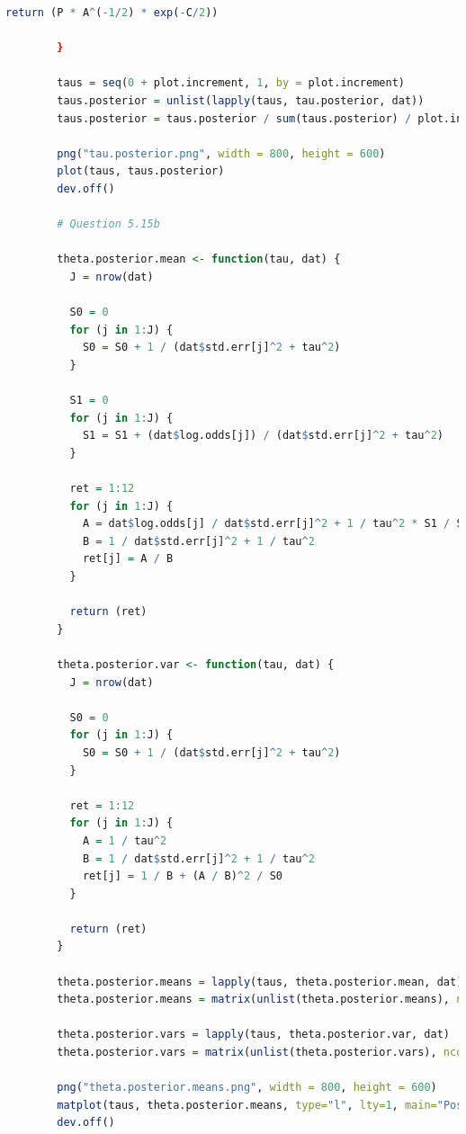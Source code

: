 \documentclass{article}
\begin{document}
{\begin{lstlisting}[language=R]
          return (P * A^(-1/2) * exp(-C/2))
          
        }
        
        taus = seq(0 + plot.increment, 1, by = plot.increment)
        taus.posterior = unlist(lapply(taus, tau.posterior, dat))
        taus.posterior = taus.posterior / sum(taus.posterior) / plot.increment # rescale to 1
        
        png("tau.posterior.png", width = 800, height = 600)
        plot(taus, taus.posterior)
        dev.off()
        
        # Question 5.15b
        
        theta.posterior.mean <- function(tau, dat) {
          J = nrow(dat)
          
          S0 = 0
          for (j in 1:J) {
            S0 = S0 + 1 / (dat$std.err[j]^2 + tau^2)
          }
          
          S1 = 0
          for (j in 1:J) {
            S1 = S1 + (dat$log.odds[j]) / (dat$std.err[j]^2 + tau^2)
          }
          
          ret = 1:12
          for (j in 1:J) {
            A = dat$log.odds[j] / dat$std.err[j]^2 + 1 / tau^2 * S1 / S0
            B = 1 / dat$std.err[j]^2 + 1 / tau^2
            ret[j] = A / B
          }
          
          return (ret)
        }
        
        theta.posterior.var <- function(tau, dat) {
          J = nrow(dat)
          
          S0 = 0
          for (j in 1:J) {
            S0 = S0 + 1 / (dat$std.err[j]^2 + tau^2)
          }
          
          ret = 1:12
          for (j in 1:J) {
            A = 1 / tau^2
            B = 1 / dat$std.err[j]^2 + 1 / tau^2
            ret[j] = 1 / B + (A / B)^2 / S0
          }
          
          return (ret)
        }
        
        theta.posterior.means = lapply(taus, theta.posterior.mean, dat)
        theta.posterior.means = matrix(unlist(theta.posterior.means), ncol=J, byrow=T)
        
        theta.posterior.vars = lapply(taus, theta.posterior.var, dat)
        theta.posterior.vars = matrix(unlist(theta.posterior.vars), ncol=J, byrow=T)
        
        png("theta.posterior.means.png", width = 800, height = 600)
        matplot(taus, theta.posterior.means, type="l", lty=1, main="Posterior means of theta")
        dev.off()
        

\end{lstlisting}}
\end{document}
